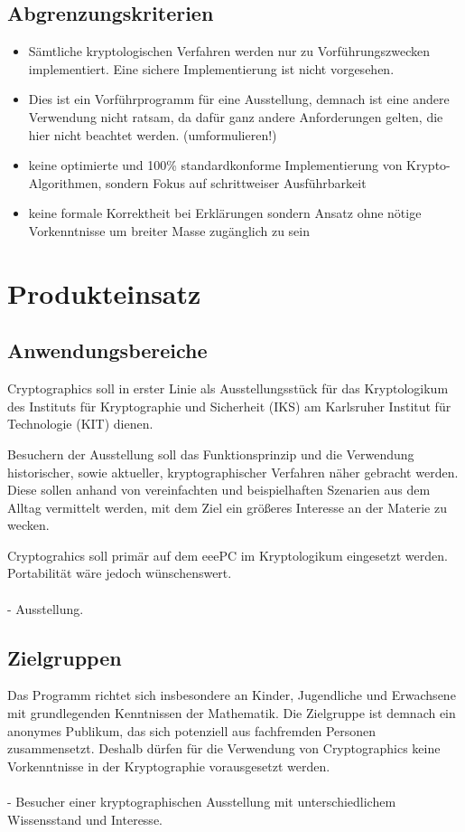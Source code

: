 \documentclass{article}
\begin{document}
\subsection{Abgrenzungskriterien}
\begin{itemize}
    \item Sämtliche kryptologischen Verfahren werden nur zu Vorführungszwecken implementiert. Eine sichere Implementierung ist nicht vorgesehen.
    \item Dies ist ein Vorführprogramm für eine Ausstellung, demnach ist eine andere  Verwendung nicht ratsam, 
        da dafür ganz andere Anforderungen gelten, die hier nicht beachtet werden. (umformulieren!)
    \item keine optimierte und 100\% standardkonforme Implementierung von Krypto-Algorithmen, 
        sondern Fokus auf schrittweiser Ausführbarkeit
    \item keine formale Korrektheit bei Erklärungen sondern Ansatz ohne nötige Vorkenntnisse 
        um breiter Masse zugänglich zu sein
\end{itemize}

\section{Produkteinsatz}
\subsection{Anwendungsbereiche}
Cryptographics soll in erster Linie als Ausstellungsstück für das Kryptologikum des Instituts für Kryptographie und Sicherheit (IKS) 
am Karlsruher Institut für Technologie (KIT) dienen. 

Besuchern der Ausstellung soll das Funktionsprinzip und die Verwendung historischer, 
sowie aktueller, kryptographischer Verfahren näher   gebracht werden. 
Diese sollen anhand von vereinfachten und beispielhaften Szenarien aus dem Alltag vermittelt werden, 
mit dem Ziel ein größeres Interesse an der Materie zu wecken.

Cryptograhics soll primär auf dem eeePC im Kryptologikum eingesetzt werden. Portabilität wäre jedoch wünschenswert.
\\ 
\\
- Ausstellung.

\subsection{Zielgruppen}
Das Programm richtet sich insbesondere an Kinder, Jugendliche und Erwachsene mit grundlegenden Kenntnissen der Mathematik. 
Die Zielgruppe ist demnach ein anonymes Publikum, das sich potenziell aus fachfremden Personen zusammensetzt. 
Deshalb dürfen für die Verwendung von Cryptographics keine Vorkenntnisse in der Kryptographie vorausgesetzt werden.
\\
\\
- Besucher einer kryptographischen Ausstellung mit unterschiedlichem Wissensstand und Interesse.
\end{document}
